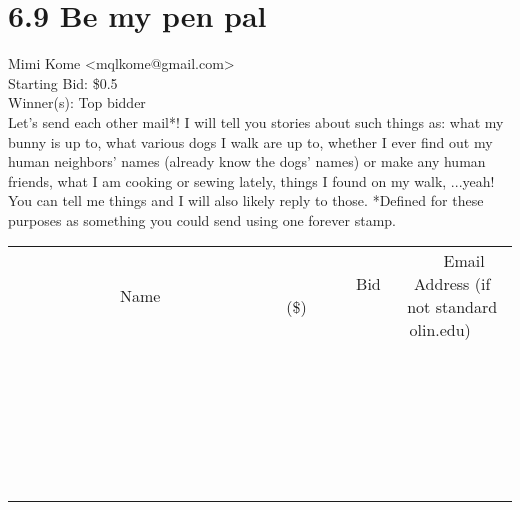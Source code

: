 \documentclass[11pt]{article}
\begin{document}
					\section*{6.9 Be my pen pal}
					Mimi Kome <mqlkome@gmail.com> \\
					Starting Bid: \$0.5 \\
					Winner(s): Top bidder \\
					Let's send each other mail*! I will tell you stories about such things as: what my bunny is up to, what various dogs I walk are up to, whether I ever find out my human neighbors' names (already know the dogs' names) or make any human friends, what I am cooking or sewing lately, things I found on my walk, ...yeah! You can tell me things and I will also likely reply to those. *Defined for these purposes  as something you could send using one forever stamp. \\
					[6ex]
					\begin{tabular}{c c c}
						~~~~~~~~~~~~~Name~~~~~~~~~~~~~ & ~~~~~~~~~Bid (\$)~~~~~~~~~ & ~~~Email Address (if not standard olin.edu)~~~ \\
				
 & & \\
\hline
 & & \\
\hline
 & & \\
\hline
 & & \\
\hline
 & & \\
\hline
 & & \\
\hline
 & & \\
\hline
 & & \\
\hline
 & & \\
\hline
 & & \\
\hline
 & & \\
\hline
 & & \\
\hline
 & & \\
\hline
 & & \\
\hline
 & & \\
\hline
 & & \\
\hline
 & & \\
\hline
 & & \\
\hline
 & & \\
\hline
 & & \\
\hline
 & & \\
\hline
 & & \\
\hline
 & & \\
\hline
 & & \\
\hline
 & & \\
\hline
 & & \\
\hline
					\end{tabular}
					\clearpage
				
\end{document}
